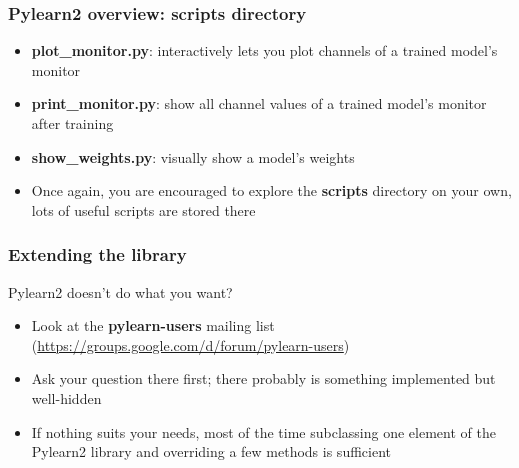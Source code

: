 \documentclass[mathserif, xcolor=dvipsnames]{beamer}
\begin{document}
\begin{frame}
    \frametitle{Pylearn2 overview: \textbf{scripts} directory}
    \begin{itemize}\addtolength{\itemsep}{0.5\baselineskip}
        \item{\textbf{plot\_monitor.py}: interactively lets you plot channels of
              a trained model's monitor}
        \item{\textbf{print\_monitor.py}: show all channel values of a trained
              model's monitor after training}
        \item{\textbf{show\_weights.py}: visually show a model's weights}
        \item{Once again, you are encouraged to explore the \textbf{scripts}
              directory on your own, lots of useful scripts are stored there}
    \end{itemize}

\end{frame}

\begin{frame}
    \frametitle{Extending the library}
    Pylearn2 doesn't do what you want?
    \begin{itemize}\addtolength{\itemsep}{0.5\baselineskip}
            \item{Look at the \textbf{pylearn-users} mailing list
                  (\url{https://groups.google.com/d/forum/pylearn-users})}
            \item{Ask your question there first; there probably is something
                  implemented but well-hidden}
            \item{If nothing suits your needs, most of the time subclassing one
                  element of the Pylearn2 library and overriding a few methods
                  is sufficient}
    \end{itemize}

\end{frame}
\end{document}
